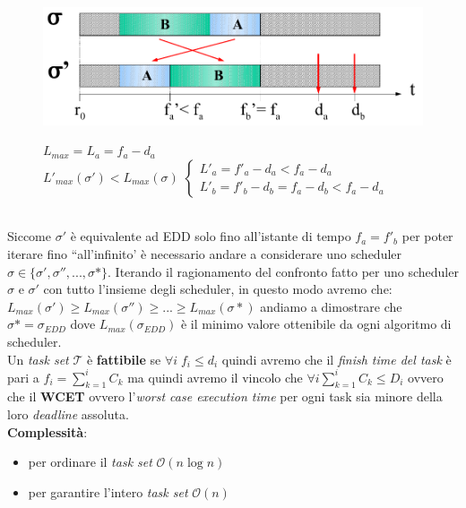 \begin{figure}[h]
    \centering
    \begin{minipage}[t]{0.45\textwidth}
        \centering
        \includegraphics[width=\textwidth]{img/edd_opt}
    \end{minipage}
    \begin{minipage}[t]{0.45\textwidth}
        \centering
        $L_{max} = L_a = f_a - d_a$ \\ 
        $L'_{max}(\sigma') < L_{max}(\sigma)$
        \begin{math}
            \begin{cases}
                L'_a = f'_a - d_a < f_a - d_a \\
                L'_b = f'_b - d_b = f_a - d_b < f_a - d_a
            \end{cases}
        \end{math}
    \end{minipage}
\end{figure}
\\
Siccome $\sigma'$ è equivalente ad EDD solo fino all'istante di tempo $f_a = f'_b$ per poter iterare fino ``all'infinito' è necessario andare a considerare uno scheduler $\sigma \in \{\sigma', \sigma'', ..., \sigma*\}$. Iterando il ragionamento del confronto fatto per uno scheduler $\sigma$ e $\sigma'$ con tutto l'insieme degli scheduler, in questo modo avremo che: $L_{max}(\sigma') \geq L_{max}(\sigma'') \geq ... \geq L_{max}(\sigma*)$ andiamo a dimostrare che $\sigma* = \sigma_{EDD}$ dove $L_{max}(\sigma_{EDD})$ è il minimo valore ottenibile da ogni algoritmo di scheduler. \\
Un \textit{task set} $\mathcal{T}$ è \textbf{fattibile} se $\forall i \; f_i \leq d_i$ quindi avremo che il \textit{finish time del task} è pari a $f_i = \sum_{k = 1}^i C_k$ ma quindi avremo il vincolo che $\forall i \sum_{k = 1}^i C_k \leq D_i$ ovvero che il \textbf{WCET} ovvero l'\textit{worst case execution time} per ogni task sia minore della loro \textit{deadline} assoluta. \\
\textbf{Complessità}:
\begin{itemize}
    \item per ordinare il \textit{task set} $\mathcal{O}(n \log n)$
    \item per garantire l'intero \textit{task set} $\mathcal{O}(n)$
\end{itemize}

